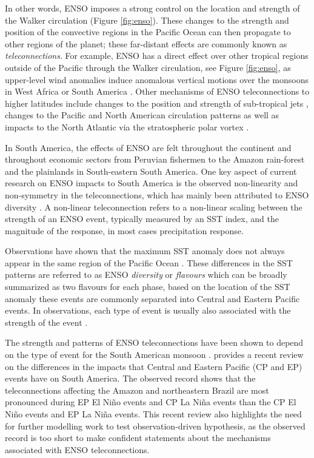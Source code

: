 In other words, ENSO imposes a strong control on the location and strength of the Walker circulation (Figure \ref{fig:enso}). These changes to the strength and position of the convective regions in the Pacific Ocean can then propagate to other regions of the planet; these far-distant effects are commonly known as \textit{teleconnections}.  
For example, ENSO has a direct effect over other tropical regions outside of the Pacific through the Walker circulation, see Figure \ref{fig:enso}, as upper-level wind anomalies induce anomalous vertical motions over the monsoons in West Africa \citep{ropelewski1986,ropelewski1987} or South America \citep{sulca2018}.  
  Other mechanisms of ENSO teleconnections to higher latitudes include changes to the position and strength of sub-tropical jets \citep{fereday2020}, changes to the Pacific and North American circulation patterns \citep{bayr2019} as well as impacts to the North Atlantic via the stratospheric polar vortex \citep{domeisen2019}.
  
  In South America, the effects of ENSO are felt throughout the continent and throughout economic sectors from Peruvian fishermen \citep{takahashi2004} to the Amazon rain-forest and the plainlands in South-eastern South America\citep{grimm2011,marengo2012}. 
  One key aspect of current research on ENSO impacts to South America is the observed non-linearity and non-symmetry in the teleconnections, which has mainly been attributed to ENSO diversity \citep{tedeschi2015,cai2020}.
A non-linear teleconnection refers to a non-linear scaling between the strength of an ENSO event, typically measured by an SST index, and the magnitude of the response, in most cases precipitation response. %

Observations have shown that the maximum SST anomaly does not always appear in the same region of the Pacific Ocean \citep{ashok2009,dommenget2013}. These differences in the SST patterns are referred to as ENSO \textit{ diversity} or \textit{flavours} which can be broadly summarized as two flavours for each phase, based on the location of the SST anomaly these events are commonly separated into Central and Eastern Pacific events.  In observations, each type of event is usually also associated with the strength of the event \citep{dommenget2013}. 

The strength and patterns of ENSO teleconnections have been shown to depend on the type of event for the South American monsoon \citep{rodrigues2011,sulca2018}. 
\cite{cai2020} provides a recent review on the differences in the impacts that Central and Eastern Pacific (CP and EP) events have on South America.
The observed record shows that the teleconnections affecting the Amazon and northeastern Brazil are most pronounced during EP El Niño events and CP La Niña events than the CP El Niño events and EP La Niña events. 
 This recent review also highlights the need for further modelling work to test observation-driven hypothesis, as the observed record is too short to make confident statements about the mechanisms associated with ENSO teleconnections.

